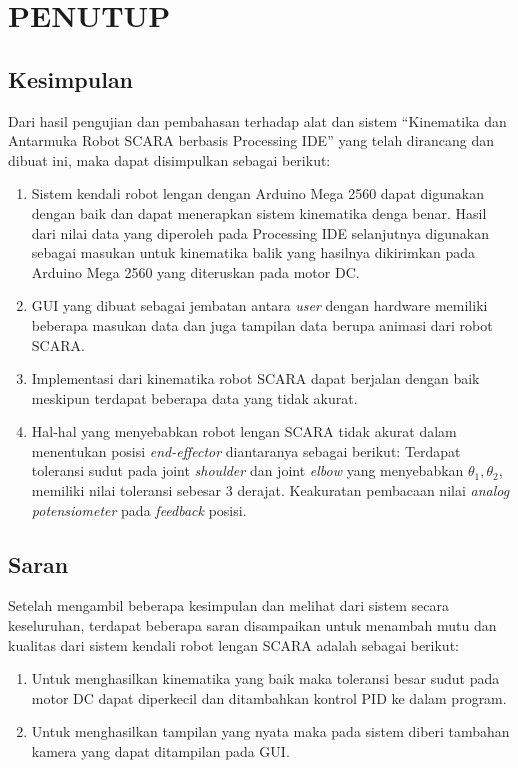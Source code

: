 
\chapter{PENUTUP}
\section{Kesimpulan}
Dari hasil pengujian dan pembahasan terhadap alat dan sistem “Kinematika dan Antarmuka Robot SCARA berbasis Processing IDE” yang telah dirancang dan dibuat ini, maka dapat disimpulkan sebagai berikut:
\begin{enumerate}
	\item Sistem kendali robot lengan dengan Arduino Mega 2560 dapat digunakan dengan baik dan dapat menerapkan sistem kinematika denga benar. Hasil dari nilai data yang diperoleh pada Processing IDE selanjutnya digunakan sebagai masukan untuk kinematika balik yang hasilnya dikirimkan pada Arduino Mega 2560 yang diteruskan pada motor DC.
	\item GUI yang dibuat sebagai jembatan antara \textit{user} dengan hardware memiliki beberapa masukan data dan juga tampilan data berupa animasi dari robot SCARA.
	\item Implementasi dari kinematika robot SCARA dapat berjalan dengan baik meskipun terdapat beberapa data yang tidak akurat. 
	\item  Hal-hal yang menyebabkan robot lengan SCARA  tidak akurat dalam menentukan posisi \textit{end-effector} diantaranya sebagai berikut:
	\subitem   Terdapat toleransi sudut pada joint \textit{shoulder} dan joint \textit{elbow} yang menyebabkan $\theta_{1}, \theta_{2}$, memiliki nilai toleransi sebesar 3 derajat. 
	\subitem  Keakuratan  pembacaan nilai \textit{analog potensiometer} pada \textit{feedback} posisi. 
\end{enumerate}
\section{Saran}
Setelah mengambil beberapa kesimpulan dan melihat dari sistem secara keseluruhan, terdapat beberapa saran disampaikan untuk menambah mutu dan kualitas dari sistem kendali robot lengan SCARA adalah sebagai berikut: 
\begin{enumerate}
	\item Untuk menghasilkan kinematika yang baik maka toleransi besar sudut pada motor DC dapat diperkecil dan ditambahkan kontrol PID ke dalam program.
	\item Untuk menghasilkan tampilan yang nyata maka pada sistem diberi tambahan kamera yang dapat ditampilan pada GUI.
\end{enumerate}